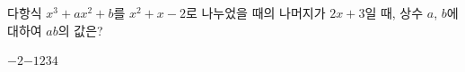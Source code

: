 다항식 $x^3+ax^2+b$를 $x^2+x-2$로 나누었을 때의 나머지가 $2x+3$일 때, 상수 $a$, $b$에 대하여 $ab$의 값은?
\begin{choices32}{$-2$}{$-1$}{$2$}{$3$}{$4$}\end{choices32}

